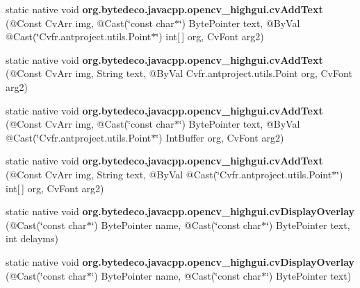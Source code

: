 \begin{DoxyCompactItemize}
\item 
\mbox{\label{group__highgui__c_ga2e03a33f876e3a86862f6d82ec9f73d1}} 
static native void {\bfseries org.\+bytedeco.\+javacpp.\+opencv\+\_\+highgui.\+cv\+Add\+Text} (@Const Cv\+Arr img, @Cast(\char`\"{}const char$\ast$\char`\"{}) Byte\+Pointer text, @By\+Val @Cast(\char`\"{}Cv\+fr.antproject.utils.Point$\ast$\char`\"{}) int\mbox{[}$\,$\mbox{]} org, Cv\+Font arg2)
\item 
\mbox{\label{group__highgui__c_ga654315abe250fde29f27380e0ea2b0fe}} 
static native void {\bfseries org.\+bytedeco.\+javacpp.\+opencv\+\_\+highgui.\+cv\+Add\+Text} (@Const Cv\+Arr img, String text, @By\+Val Cv\+fr.antproject.utils.Point org, Cv\+Font arg2)
\item 
\mbox{\label{group__highgui__c_gaa8f29faac1934fa37fd36236823a2c07}} 
static native void {\bfseries org.\+bytedeco.\+javacpp.\+opencv\+\_\+highgui.\+cv\+Add\+Text} (@Const Cv\+Arr img, @Cast(\char`\"{}const char$\ast$\char`\"{}) Byte\+Pointer text, @By\+Val @Cast(\char`\"{}Cv\+fr.antproject.utils.Point$\ast$\char`\"{}) Int\+Buffer org, Cv\+Font arg2)
\item 
\mbox{\label{group__highgui__c_gaa771a5036963826183dfc0ed7f3b0009}} 
static native void {\bfseries org.\+bytedeco.\+javacpp.\+opencv\+\_\+highgui.\+cv\+Add\+Text} (@Const Cv\+Arr img, String text, @By\+Val @Cast(\char`\"{}Cv\+fr.antproject.utils.Point$\ast$\char`\"{}) int\mbox{[}$\,$\mbox{]} org, Cv\+Font arg2)
\item 
\mbox{\label{group__highgui__c_ga3831a8dd35141deebe970c3ec33f0a62}} 
static native void {\bfseries org.\+bytedeco.\+javacpp.\+opencv\+\_\+highgui.\+cv\+Display\+Overlay} (@Cast(\char`\"{}const char$\ast$\char`\"{}) Byte\+Pointer name, @Cast(\char`\"{}const char$\ast$\char`\"{}) Byte\+Pointer text, int delayms)
\item 
\mbox{\label{group__highgui__c_ga2f793c73559e4ae5fdc015de839110ab}} 
static native void {\bfseries org.\+bytedeco.\+javacpp.\+opencv\+\_\+highgui.\+cv\+Display\+Overlay} (@Cast(\char`\"{}const char$\ast$\char`\"{}) Byte\+Pointer name, @Cast(\char`\"{}const char$\ast$\char`\"{}) Byte\+Pointer text)
\item 

\end{DoxyCompactItemize}

